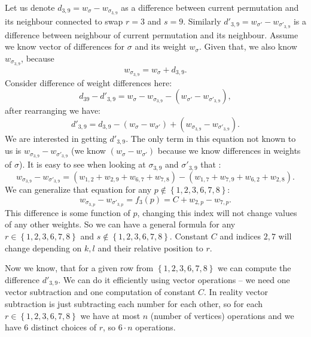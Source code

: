 		Let us denote $d_{3,9} = w_{\sigma} - w_{\sigma_{3,9}}$ as a difference between current permutation and its neighbour connected to swap  $r=3$ and $s=9$. Similarly $d'_{3,9} = w_{\sigma'} - w_{\sigma'_{3,9}}$ is a difference between neighbour of current permutation and its neighbour. Assume we know vector of differences for $\sigma$ and its weight $w_\sigma$. Given that, we also know $w_{\sigma_{3,9}}$, because
		\begin{equation*}
			w_{\sigma_{3,9}} = w_\sigma + d_{3,9}.
		\end{equation*}
		Consider difference of weight differences here:
		\begin{equation*}
			d_{39} - d'_{3,9} = w_{\sigma} - w_{\sigma_{3,9}} - (w_{\sigma'} - w_{\sigma'_{3,9}}),
		\end{equation*}
		after rearranging we have:
		\begin{equation*}
			d'_{3,9} = d_{3,9} - (w_{\sigma} - w_{\sigma'}) + (w_{\sigma_{3,9}} - w_{\sigma'_{3,9}}).
		\end{equation*}
		We are interested in getting $d'_{3,9}$. The only term in this equation not known to us is $w_{\sigma_{3,9}} - w_{\sigma'_{3,9}}$ (we know $(w_{\sigma} - w_{\sigma'})$ because we know differences in weights of $\sigma$). It is easy to see when looking at $\sigma_{3,9}$ and $\sigma'_{3,9}$ that :
		\begin{equation*}
			w_{\sigma_{3,9}} - w_{\sigma'_{3,9}} = (w_{1,2} + w_{2,9} + w_{6,7} + w_{7,8}) - (w_{1,7} + w_{7,9} + w_{6,2} + w_{2,8}).
		\end{equation*}
		We can generalize that equation for any $p \notin \left\{ 1,2,3,6,7,8 \right\}$:
		\begin{equation*}
			w_{\sigma_{3,p}} - w_{\sigma'_{3,p}} = f_3(p) = C + w_{2,p} - w_{7,p}.
		\end{equation*}
		This difference is some function of $p$, changing this index will not change values of any other weights. So we can have a general formula for any $r \in \left\{ 1,2,3,6,7,8 \right\}$ and $s \notin \left\{ 1,2,3,6,7,8 \right\}$. Constant $C$ and indices $2,7$ will change depending on $k,l$ and their relative position to $r$.
		
		Now we know, that for a given row from $\left\{ 1,2,3,6,7,8 \right\}$ we can compute the difference $d'_{3,9}$. We can do it efficiently using vector operations -- we need one vector subtraction and one computation of constant $C$. In reality vector subtraction is just subtracting each number for each other, so for each $r \in \left\{ 1,2,3,6,7,8 \right\}$ we have at most $n$ (number of vertices) operations and we have $6$ distinct choices of $r$, so $6\cdot n$ operations.
	
